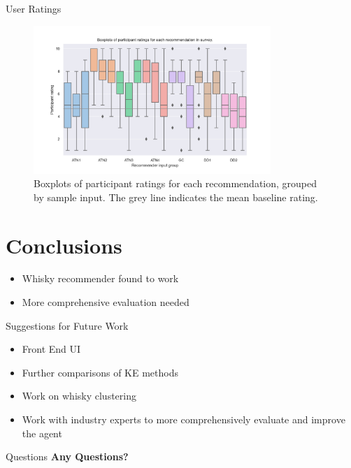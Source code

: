\documentclass{beamer}
\begin{document}
\begin{frame}{User Ratings}
    \begin{figure}[!htb]
        \centering
        \includegraphics[width=0.8\textwidth]{graphics/all_recommendations}
        \caption{Boxplots of participant ratings for each recommendation, grouped by sample input. The grey line 
        indicates the mean baseline rating.}\label{fig:allrec}
    \end{figure}
\end{frame}


\section{Conclusions} 

\begin{frame}
    
    \begin{itemize}
        \item Whisky recommender found to work
        \item More comprehensive evaluation needed
    \end{itemize}
    \begin{block}{Suggestions for Future Work}
        \begin{itemize}
            \item Front End UI
            \item Further comparisons of KE methods
            \item Work on whisky clustering
            \item Work with industry experts to more comprehensively evaluate and improve the agent
        \end{itemize}
    \end{block}

\end{frame}

\begin{frame}{Questions}
\textbf{Any Questions?}
\end{frame}

\end{document}
